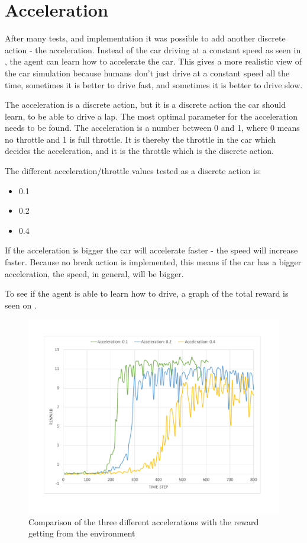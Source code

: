 \section{Acceleration}\label{sectionAcceleration_new}
After many tests, and implementation it was possible to add another discrete action - the acceleration. Instead of the car driving at a constant speed as seen in , the agent can learn how to accelerate the car. This gives a more realistic view of the car simulation because humans don't just drive at a constant speed all the time, sometimes it is better to drive fast, and sometimes it is better to drive slow.  

The acceleration is a discrete action, but it is a discrete action the car should learn, to be able to drive a lap. The most optimal parameter for the acceleration needs to be found. The acceleration is a number between 0 and 1, where 0 means no throttle and 1 is full throttle. It is thereby the throttle in the car which decides the acceleration, and it is the throttle which is the discrete action.

The different acceleration/throttle values tested as a discrete action is:

\begin{itemize}
	\item 0.1
	\item 0.2
	\item 0.4
\end{itemize} 
   
If the acceleration is bigger the car will accelerate faster - the speed will increase faster. Because no break action is implemented, this means if the car has a bigger acceleration, the speed, in general, will be bigger. 

To see if the agent is able to learn how to drive, a graph of the total reward is seen on .

\begin{figure}[H]
	\centering
	\includegraphics[width=1\textwidth]{Figures/Result/change_of_acceleration_new_reward_graph.pdf}
	\caption{Comparison of the three different accelerations with the reward getting from the environment}
	\label{fig:change_of_acceleration_new_reward_graph}
\end{figure} 

